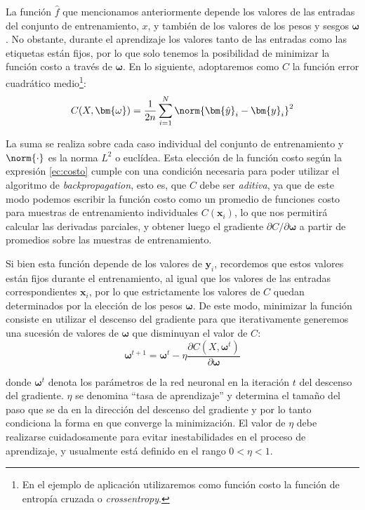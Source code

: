 La función $\hat{f}$ que mencionamos anteriormente depende los valores de las entradas del conjunto de entrenamiento, $x$, y también de los valores de los pesos y sesgos $\bm{\omega}$. No obstante, durante el aprendizaje los valores tanto de las entradas como las etiquetas están fijos, por lo que solo tenemos la posibilidad de minimizar la función costo a través de $\bm{\omega}$. En lo siguiente, adoptaremos como $C$ la función error cuadrático medio\footnote{En el ejemplo de aplicación utilizaremos como función costo la función de entropía cruzada o \textit{crossentropy}.}:
\begin{equation} C(X, \bm{\omega}) = \frac{1}{2n} \sum_{i=1}^N \norm{\bm{\hat{y}}_i - \bm{y}_i}^2 \label{ec:costo} \end{equation}

La suma se realiza sobre cada caso individual del conjunto de entrenamiento y $\norm{\cdot}$ es la norma $L^2$ o euclídea. Esta elección de la función costo según la expresión \eqref{ec:costo} cumple con una condición necesaria para poder utilizar el algoritmo de \textit{backpropagation}, esto es, que $C$ debe ser \textit{aditiva}, ya que de este modo podemos escribir la función costo como un promedio de funciones costo para muestras de entrenamiento individuales $C(\bm{x}_i)$, lo que nos permitirá calcular las derivadas parciales, y obtener luego el gradiente $\partial C / \partial \bm{\omega}$ a partir de promedios sobre las muestras de entrenamiento.

Si bien esta función depende de los valores de $\bm{y}_i$, recordemos que estos valores están fijos durante el entrenamiento, al igual que los valores de las entradas correspondientes $\bm{x}_i$, por lo que estrictamente los valores de $C$ quedan determinados por la elección de los pesos $\bm{\omega}$. De este modo, minimizar la función consiste en utilizar el descenso del gradiente para que iterativamente generemos una sucesión de valores de $\bm{\omega}$ que disminuyan el valor de $C$:
\begin{equation}\bm{\omega}^{t+1} = \bm{\omega}^t - \eta \frac{\partial C(X, \bm{\omega}^t)}{\partial \bm{\omega}}
\label{eq:actpesos}
\end{equation}

donde $\bm{\omega}^t$ denota los parámetros de la red neuronal en la iteración $t$ del descenso del gradiente. $\eta$ se denomina ``tasa de aprendizaje'' y determina el tamaño del paso que se da en la dirección del descenso del gradiente y por lo tanto condiciona la forma en que converge la minimización. El valor de $\eta$ debe realizarse cuidadosamente para evitar inestabilidades en el proceso de aprendizaje, y usualmente está definido en el rango $0 < \eta < 1$.

